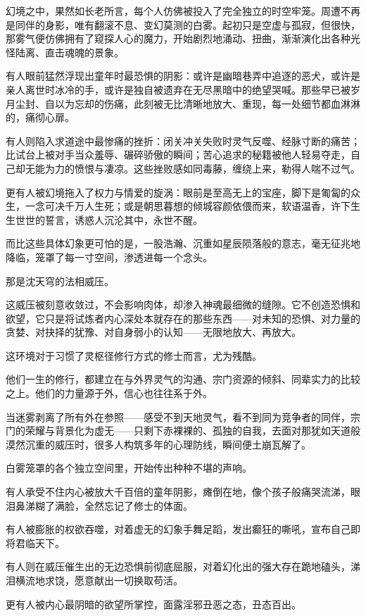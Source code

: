 幻境之中，果然如长老所言，每个人仿佛被投入了完全独立的时空牢笼。周遭不再是同伴的身影，唯有翻滚不息、变幻莫测的白雾。起初只是空虚与孤寂，但很快，那雾气便仿佛拥有了窥探人心的魔力，开始剧烈地涌动、扭曲，渐渐演化出各种光怪陆离、直击魂魄的景象。

有人眼前猛然浮现出童年时最恐惧的阴影：或许是幽暗巷弄中追逐的恶犬，或许是亲人离世时冰冷的手，或许是独自被遗弃在无尽黑暗中的绝望哭喊。那些早已被岁月尘封、自以为忘却的伤痛，此刻被无比清晰地放大、重现，每一处细节都血淋淋的，痛彻心扉。

有人则陷入求道途中最惨痛的挫折：闭关冲关失败时灵气反噬、经脉寸断的痛苦；比试台上被对手当众羞辱、碾碎骄傲的瞬间；苦心追求的秘籍被他人轻易夺走，自己却无能为力的愤恨与凄凉。这些挫败感如同毒藤，缠绕上来，勒得人喘不过气。

更有人被幻境拖入了权力与情爱的旋涡：眼前是至高无上的宝座，脚下是匍匐的众生，一念可决千万人生死；或是朝思暮想的倾城容颜依偎而来，软语温香，许下生生世世的誓言，诱惑人沉沦其中，永世不醒。

而比这些具体幻象更可怕的是，一股浩瀚、沉重如星辰陨落般的意志，毫无征兆地降临，笼罩了每一寸空间，渗透进每一个念头。

那是沈天穹的法相威压。

这威压被刻意收敛过，不会影响肉体，却渗入神魂最细微的缝隙。它不创造恐惧和欲望，它只是将试炼者内心深处本就存在的那些东西——对未知的恐惧、对力量的贪婪、对抉择的犹豫、对自身弱小的认知——无限地放大、再放大。

这环境对于习惯了灵枢径修行方式的修士而言，尤为残酷。

他们一生的修行，都建立在与外界灵气的沟通、宗门资源的倾斜、同辈实力的比较之上。他们的力量源于外，信心也往往系于外。

当迷雾剥离了所有外在参照——感受不到天地灵气，看不到同为竞争者的同伴，宗门的荣耀与背景化为虚无——只剩下赤裸裸的、孤独的自我，去面对那犹如天道般漠然沉重的威压时，很多人构筑多年的心理防线，瞬间便土崩瓦解了。

白雾笼罩的各个独立空间里，开始传出种种不堪的声响。

有人承受不住内心被放大千百倍的童年阴影，瘫倒在地，像个孩子般痛哭流涕，眼泪鼻涕糊了满脸，全然忘记了修士的体面。

有人被膨胀的权欲吞噬，对着虚无的幻象手舞足蹈，发出癫狂的嘶吼，宣布自己即将君临天下。

有人则在威压催生出的无边恐惧前彻底屈服，对着幻化出的强大存在跪地磕头，涕泪横流地求饶，愿意献出一切换取苟活。

更有人被内心最阴暗的欲望所掌控，面露淫邪丑恶之态，丑态百出。

